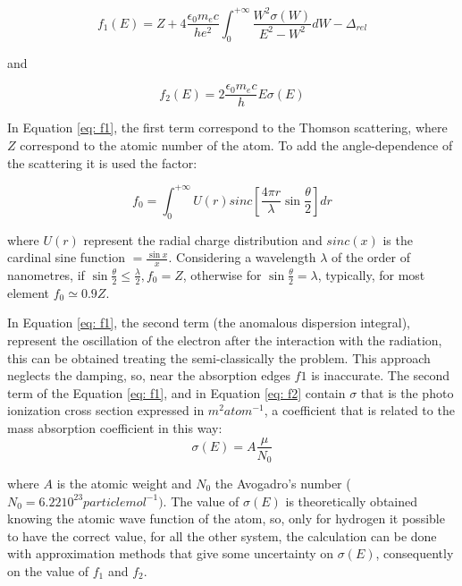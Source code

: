 \begin{equation}
f_1(E) = Z + 4 \frac{\epsilon_0 m_e c}{h e^2} \int_{0}^{+ \infty}\frac{W^2 \sigma(W)}{E^2 - W^2} dW - \Delta_{rel}
\label{eq: f1}
\end{equation}
\begin{flushleft}
and
\end{flushleft}
\begin{equation}
f_2(E) = 2 \frac{\epsilon_0 m_e c}{h} E \sigma(E)
\label{eq: f2}
\end{equation}
\begin{flushleft}
In Equation \ref{eq: f1}, the first term correspond to the Thomson scattering, where $Z $ correspond to the atomic number of the atom. To add the angle-dependence of the scattering it is used the factor:
\end{flushleft}
\begin{equation}
f_0 = \int_{0}^{+ \infty} U(r) sinc \left[ \frac{4 \pi r}{\lambda} \sin \frac{\theta}{2} \right] dr
\label{f0}
\end{equation}
\begin{flushleft}
where $U(r) $ represent the radial charge distribution and $sinc(x)$ is the cardinal sine function $ = \frac{\sin x}{x} $. Considering a wavelength $\lambda $ of the order of nanometres, if $\sin \frac{\theta}{2} \leq \frac{\lambda}{2}, f_0=Z $, otherwise for $\sin \frac{\theta}{2}=\lambda$, typically, for most element $ f_0 \simeq 0.9Z $.
\end{flushleft}
In Equation \ref{eq: f1}, the second term (the anomalous dispersion integral), represent the oscillation of the electron after the interaction with the radiation, this can be obtained treating the semi-classically the problem. This approach neglects the damping, so, near the absorption edges $f1 $ is inaccurate. The second term of the Equation \ref{eq: f1}, and in Equation \ref{eq: f2} contain $\sigma $ that is the photo ionization cross section expressed in $m^2 atom ^{-1} $, a coefficient that is related to the mass absorption coefficient in this way: 
\begin{equation}
\sigma(E) = A \frac{\mu}{N_0}
\label{eq: sigma}
\end{equation}
\begin{flushleft}
where $A $ is the atomic weight and $N_0 $ the Avogadro's number ($N_0 = 6.22  10^{23} particle mol^{-1}) $. The value of $\sigma(E) $ is theoretically obtained knowing the atomic wave function of the atom, so, only for hydrogen it possible to have the correct value, for all the other system, the calculation can be done with approximation methods that give some uncertainty on $\sigma(E) $, consequently on the value of $f_1 $ and $f_2 $.
\end{flushleft}
